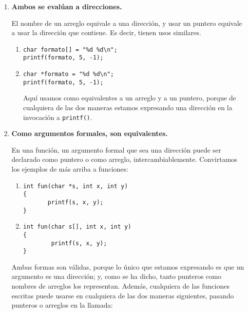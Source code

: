 \begin{enumerate}
	\item \textbf{Ambos se evalúan a direcciones.}
	
El nombre de un arreglo equivale a una dirección, y usar un puntero equivale a
usar la dirección que contiene. Es decir, tienen usos similares.

\begin{enumerate}[label=\alph*.]

\item 
\begin{lstlisting}
char formato[] = "%d %d\n";
printf(formato, 5, -1);
\end{lstlisting} 

\item 
\begin{lstlisting}
char *formato = "%d %d\n";
printf(formato, 5, -1);
\end{lstlisting} 

Aquí usamos como equivalentes a un arreglo y a un puntero, porque de cualquiera
de las dos maneras estamos expresando una dirección en la invocación a \lstinline{printf()}.
\end{enumerate}



\item \textbf{Como argumentos formales, son equivalentes.}

En una función, un argumento formal que sea una dirección puede ser declarado
como puntero o como arreglo, intercambiablemente. Convirtamos los ejemplos de
más arriba a funciones:

\begin{enumerate}[label=\alph*.]
\item 
\begin{lstlisting}
int fun(char *s, int x, int y)
{
       printf(s, x, y);
}
\end{lstlisting} 

\item 
\begin{lstlisting}
int fun(char s[], int x, int y)
{
        printf(s, x, y);
}
\end{lstlisting} 
\end{enumerate}

Ambas formas son válidas, porque lo único que estamos expresando es que un
argumento es una dirección; y, como se ha dicho, tanto punteros como nombres de
arreglos los representan. Además, cualquiera de las funciones escritas puede
usarse en cualquiera de las dos maneras siguientes, pasando punteros o arreglos
en la llamada:


\end{enumerate}
